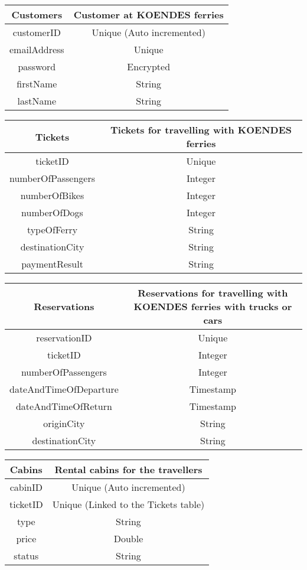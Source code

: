 \begin{table}[H]
\begin{tabular}{|c|c}
\cline{1-1}
Customers & Customer at KOENDES ferries \\ \hline
customerID & Unique (Auto incremented) \\ emailAddress & Unique \\ password & Encrypted \\ firstName & String \\ lastName & String \\ \hline
\end{tabular}
\end{table}

\begin{table}[H]
\begin{tabular}{|c|c}
\cline{1-1}
Tickets & Tickets for travelling with KOENDES ferries \\ \hline
ticketID & Unique \\
numberOfPassengers & Integer \\
numberOfBikes & Integer\\
numberOfDogs & Integer\\
typeOfFerry & String\\
destinationCity & String \\
paymentResult & String \\\hline
\end{tabular}
\end{table}

\begin{table}[H]
\begin{tabular}{|c|c}
\cline{1-1}
Reservations & Reservations for travelling with KOENDES ferries with trucks or cars \\ \hline
reservationID & Unique \\
ticketID & Integer\\
numberOfPassengers & Integer \\
dateAndTimeOfDeparture & Timestamp \\
dateAndTimeOfReturn & Timestamp \\
originCity & String \\
destinationCity & String \\\hline
\end{tabular}
\end{table}

\begin{table}[H]
\begin{tabular}{|c|c}
\cline{1-1}
Cabins & Rental cabins for the travellers \\ \hline
cabinID & Unique (Auto incremented) \\ ticketID & Unique (Linked to the Tickets table) \\ type & String \\ price & Double \\ status & String \\\hline
\end{tabular}
\end{table}

